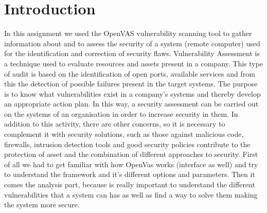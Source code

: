 \section{Introduction} \label{sec:intro}

In this assignment we used the OpenVAS vulnerability scanning tool to gather information about and to assess the security of a system (remote computer) used for the identification and correction of security flaws. Vulnerability Assessment is a technique used to evaluate resources and assets present in a company. This type of audit is based on the identification of open ports, available services and from this the detection of possible failures present in the target systems. The purpose is to know what vulnerabilities exist in a company's systems and thereby develop an appropriate action plan.
In this way, a security assessment can be carried out on the systems of an organisation in order to increase security in them. In addition to this activity, there are other concerns, so it is necessary to complement it with security solutions, such as those against malicious code, firewalls, intrusion detection tools and good security policies contribute to the protection of asset and the combination of different approaches to security. 
First of all we had to get familiar with how OpenVas works (interface as well) and try to understand the framework and it's different options and parameters. Then it comes the analysis part, because is really important to understand the different vulnerabilities that a system can has as well as find a way to solve them making the system more secure.  
\newline

